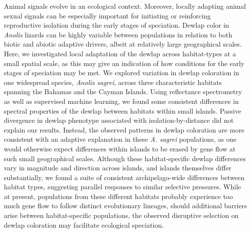 Animal signals evolve in an ecological context. Moreover, locally adapting animal sexual signals can be especially important for initiating or reinforcing reproductive isolation during the early stages of speciation. Dewlap color in \textit{Anolis} lizards can be highly variable between populations in relation to both biotic and abiotic adaptive drivers, albeit at relatively large geographical scales. Here, we investigated local adaptation of the dewlap across habitat-types at a small spatial scale, as this may give an indication of how conditions for the early stages of speciation may be met. We explored variation in dewlap coloration in one widespread species, \textit{Anolis sagrei}, across three characteristic habitats spanning the Bahamas and the Cayman Islands. Using reflectance spectrometry as well as supervised machine learning, we found some consistent differences in spectral properties of the dewlap between habitats within small islands. Passive divergence in dewlap phenotype associated with isolation-by-distance did not explain our results. Instead, the observed patterns in dewlap coloration are more consistent with an adaptive explanation in these \textit{A. sagrei} populations, as one would otherwise expect differences within islands to be erased by gene flow at such small geographical scales. Although these habitat-specific dewlap differences vary in magnitude and direction across islands, and islands themselves differ substantially, we found a suite of consistent archipelago-wide differences between habitat types, suggesting parallel responses to similar selective pressures. While at present, populations from these different habitats probably experience too much gene flow to follow distinct evolutionary lineages, should additional barriers arise between habitat-specific populations, the observed disruptive selection on dewlap coloration may facilitate ecological speciation.